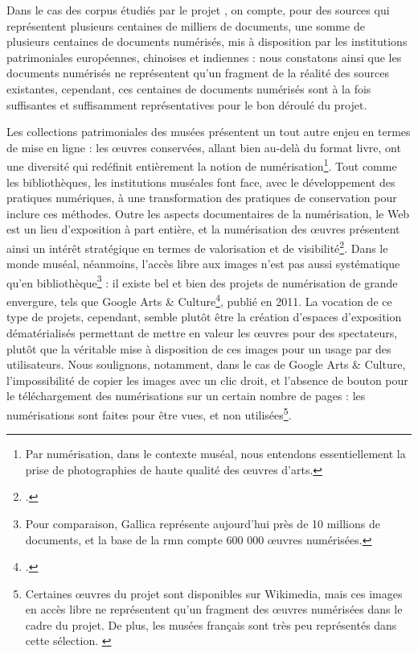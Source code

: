 Dans le cas des corpus étudiés par le projet \eida, on compte, pour des sources qui représentent plusieurs centaines de milliers de documents, une somme de plusieurs centaines de documents numérisés, mis à disposition par les institutions patrimoniales européennes, chinoises et indiennes : nous constatons ainsi que les documents numérisés ne représentent qu'un fragment de la réalité des sources existantes, cependant, ces centaines de documents numérisés sont à la fois suffisantes et suffisamment représentatives pour le bon déroulé du projet.

Les collections patrimoniales des musées présentent un tout autre enjeu en termes de mise en ligne : les œuvres conservées, allant bien au-delà du format livre, ont une diversité qui redéfinit entièrement la notion de numérisation\footnote{Par numérisation, dans le contexte muséal, nous entendons essentiellement la prise de photographies de haute qualité des œuvres d'arts.}. Tout comme les bibliothèques, les institutions muséales font face, avec le développement des pratiques numériques, à une transformation des pratiques de conservation pour inclure ces méthodes. Outre les aspects documentaires de la numérisation, le Web est un lieu d'exposition à part entière, et la numérisation des œuvres présentent ainsi un intérêt stratégique en termes de valorisation et de visibilité\footcite{baujardNumerisationPatrimoineCulturel2017}. Dans le monde muséal, néanmoins, l'accès libre aux images n'est pas aussi systématique qu'en bibliothèque\footnote{Pour comparaison, Gallica représente aujourd'hui près de 10 millions de documents, et la base de la \acrfull{rmn} compte 600 000 œuvres numérisées.} : il existe bel et bien des projets de numérisation de grande envergure, tels que Google Arts \& Culture\footcite{GoogleArtsCulture}, publié en 2011. La vocation de ce type de projets, cependant, semble plutôt être la création d'espaces d'exposition dématérialisés permettant de mettre en valeur les œuvres pour des spectateurs, plutôt que la véritable mise à disposition de ces images pour un usage par des utilisateurs. Nous soulignons, notamment, dans le cas de Google Arts \& Culture, l'impossibilité de copier les images avec un clic droit, et l'absence de bouton pour le téléchargement des numérisations sur un certain nombre de pages : les numérisations sont faites pour être vues, et non utilisées\footnote{Certaines œuvres du projet sont disponibles sur Wikimedia, mais ces images en accès libre ne représentent qu'un fragment des œuvres numérisées dans le cadre du projet. De plus, les musées français sont très peu représentés dans cette sélection. \cite{CategoryGoogleArt}}. 

